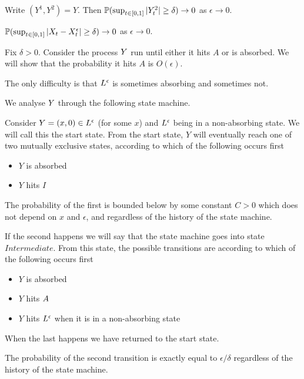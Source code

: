 {\begin{lemma}
  Write $(Y^1, Y^2) = Y$.  Then $\P(\sup_{t \in [0,1]} |Y^2_t| \ge
  \delta) \to 0$ as $\epsilon \to 0$.
\end{lemma}

\begin{lemma}
  $\P(\sup_{t \in [0,1]} |\sampled_t - \resamplede_t | \ge \delta) \to
  0$ as $\epsilon \to 0$.
\end{lemma}

Fix $\delta > 0$.  Consider the process $\rotproc$ run until either
it hits $A$ or is absorbed.  We will show that the probability it
hits $A$ is $O(\epsilon)$.

The only difficulty is that $\Le$ is sometimes absorbing and
sometimes not.

We analyse $\rotproc$ through the following state machine.

Consider $\rotproc = (x,0) \in \Le$ (for some $x$) and $\Le$ being in
a non-absorbing state.  We will call this the start state.  From the
start state, $Y$ will eventually reach one of two mutually exclusive
states, according to which of the following occurs first

\newcommand{\intermediatelines}{I}

\begin{itemize}
\item $Y$ is absorbed
\item $Y$ hits $\intermediatelines$
\end{itemize}

The probability of the first is bounded below by some constant $C > 0$
which does not depend on $x$ and $\epsilon$, and regardless of the
history of the state machine.

\newcommand{\stateintermediate}{Intermediate}

If the second happens we will say that the state machine goes into
state $\stateintermediate$.  From this state, the possible transitions
are according to which of the following occurs first

\begin{itemize}
\item $Y$ is absorbed
\item $Y$ hits $\boundarylines$
\item $Y$ hits $\Le$ when it is in a non-absorbing state
\end{itemize}

When the last happens we have returned to the start state.

The probability of the second transition is exactly equal to
$\epsilon/\delta$ regardless of the history of the state machine.

}
